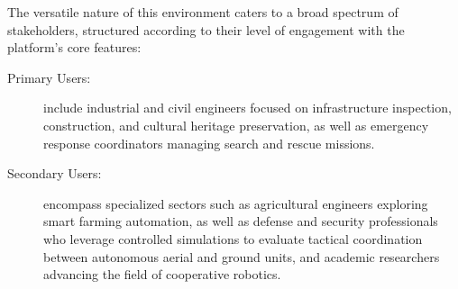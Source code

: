The versatile nature of this environment caters to a broad spectrum of stakeholders, structured according to their level of engagement with the platform's core features:

\begin{description}
    \item[Primary Users:] include industrial and civil engineers focused on infrastructure inspection, construction, and cultural heritage preservation, as well as emergency response coordinators managing search and rescue missions.
    
    \item[Secondary Users:] encompass specialized sectors such as agricultural engineers exploring smart farming automation, as well as defense and security professionals who leverage controlled simulations to evaluate tactical coordination between autonomous aerial and ground units, and academic researchers advancing the field of cooperative robotics.
\end{description} 